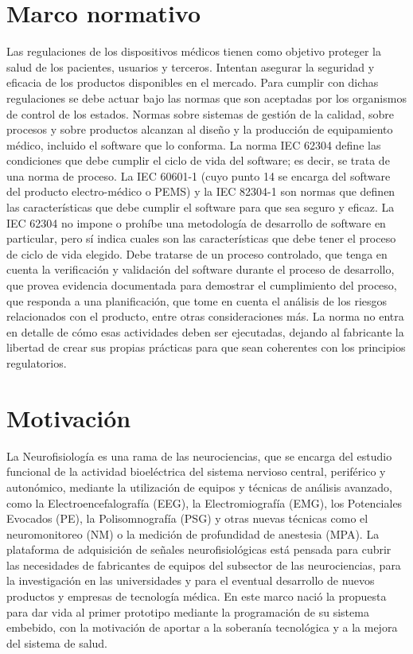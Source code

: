 \section{Marco normativo}
Las regulaciones de los dispositivos médicos tienen como objetivo proteger la salud de los pacientes, usuarios y terceros. Intentan asegurar la seguridad y eficacia de los productos disponibles en el mercado. Para cumplir con dichas regulaciones se debe actuar bajo las normas que son aceptadas por los organismos de control de los estados. Normas sobre sistemas de gestión de la calidad, sobre procesos y sobre productos alcanzan al diseño y la producción de equipamiento médico, incluido el software que lo conforma. La norma IEC 62304 \citep{REF} define las condiciones que debe cumplir el ciclo de vida del software; es decir, se trata de una norma de proceso. La IEC 60601-1 \citep{REF} (cuyo punto 14 se encarga del software del producto electro-médico o PEMS) y la IEC 82304-1 \citep{REF} son normas que definen las características que debe cumplir el software para que sea seguro y eficaz. La IEC 62304 no impone o prohíbe una metodología de desarrollo de software en particular, pero sí indica cuales son las características que debe tener el proceso de ciclo de vida elegido. Debe tratarse de un proceso controlado, que tenga en cuenta la verificación y validación del software durante el proceso de desarrollo, que provea evidencia documentada para demostrar el cumplimiento del proceso, que responda a una planificación, que tome en cuenta el análisis de los riesgos relacionados con el producto, entre otras consideraciones más. La norma no entra en detalle de cómo esas actividades deben ser ejecutadas, dejando al fabricante la libertad de crear sus propias prácticas para que sean coherentes con los principios regulatorios.

\section{Motivación}
La Neurofisiología es una rama de las neurociencias, que se encarga del estudio funcional de la actividad bioeléctrica del sistema nervioso central, periférico y autonómico, mediante la utilización de equipos y técnicas de análisis avanzado, como la Electroencefalografía (EEG), la Electromiografía (EMG), los Potenciales Evocados (PE), la Polisomnografía (PSG) y otras nuevas técnicas como el neuromonitoreo (NM) o la medición de profundidad de anestesia (MPA). La plataforma de adquisición de señales neurofisiológicas está pensada para cubrir las necesidades de fabricantes de equipos del subsector de las neurociencias, para la investigación en las universidades y para el eventual desarrollo de nuevos productos y empresas de tecnología médica. En este marco nació la propuesta para dar vida al primer prototipo mediante la programación de su sistema embebido, con la motivación de aportar a la soberanía tecnológica y a la mejora del sistema de salud. 

